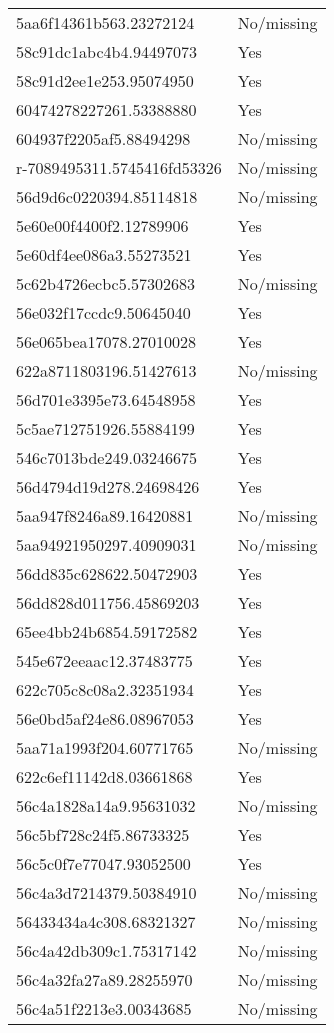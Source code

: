 \begin{tabular}{ll}
5aa6f14361b563.23272124 & No/missing \\
58c91dc1abc4b4.94497073 & Yes \\
58c91d2ee1e253.95074950 & Yes \\
60474278227261.53388880 & Yes \\
604937f2205af5.88494298 & No/missing \\
r-7089495311.5745416fd53326 & No/missing \\
56d9d6c0220394.85114818 & No/missing \\
5e60e00f4400f2.12789906 & Yes \\
5e60df4ee086a3.55273521 & Yes \\
5c62b4726ecbc5.57302683 & No/missing \\
56e032f17ccdc9.50645040 & Yes \\
56e065bea17078.27010028 & Yes \\
622a8711803196.51427613 & No/missing \\
56d701e3395e73.64548958 & Yes \\
5c5ae712751926.55884199 & Yes \\
546c7013bde249.03246675 & Yes \\
56d4794d19d278.24698426 & Yes \\
5aa947f8246a89.16420881 & No/missing \\
5aa94921950297.40909031 & No/missing \\
56dd835c628622.50472903 & Yes \\
56dd828d011756.45869203 & Yes \\
65ee4bb24b6854.59172582 & Yes \\
545e672eeaac12.37483775 & Yes \\
622c705c8c08a2.32351934 & Yes \\
56e0bd5af24e86.08967053 & Yes \\
5aa71a1993f204.60771765 & No/missing \\
622c6ef11142d8.03661868 & Yes \\
56c4a1828a14a9.95631032 & No/missing \\
56c5bf728c24f5.86733325 & Yes \\
56c5c0f7e77047.93052500 & Yes \\
56c4a3d7214379.50384910 & No/missing \\
56433434a4c308.68321327 & No/missing \\
56c4a42db309c1.75317142 & No/missing \\
56c4a32fa27a89.28255970 & No/missing \\
56c4a51f2213e3.00343685 & No/missing \\

\end{tabular}
